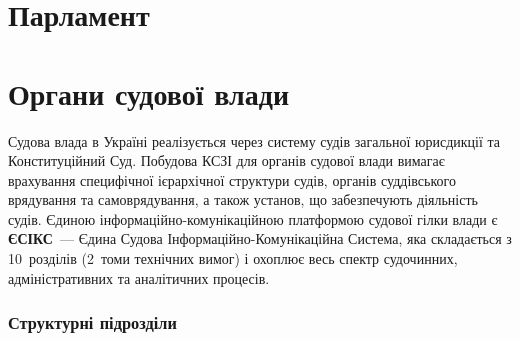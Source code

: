 \chapter{Парламент}

\chapter{Органи судової влади}

Судова влада в Україні реалізується через систему судів загальної юрисдикції та
Конституційний Суд. Побудова КСЗІ для органів судової влади вимагає врахування
специфічної ієрархічної структури судів, органів суддівського врядування та
самоврядування, а також установ, що забезпечують діяльність судів. Єдиною
інформаційно-комунікаційною платформою судової гілки влади є \textbf{ЄСІКС}~---
Єдина Судова Інформаційно-Комунікаційна Система, яка складається з 10~розділів
(2~томи технічних вимог) і охоплює весь спектр судочинних, адміністративних та
аналітичних процесів.

\subsection*{Структурні підрозділи}

